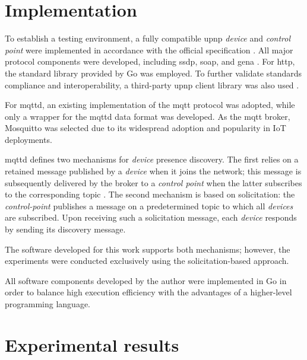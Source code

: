 \documentclass[lettersize,journal]{IEEEtran}
\begin{document}
\section{Implementation}

To establish a testing environment, a fully compatible \gls{upnp} \textit{device} and \textit{control point} were implemented in accordance with the official specification \cite{ocf_upnp_architecture_2020}. All major protocol components were developed, including \gls{ssdp}, \gls{soap}, and \gls{gena} \cite{DaniDF_MQTT-Discovery_vs_UPnP}. For \gls{http}, the standard library provided by Go was employed. To further validate standards compliance and interoperability, a third-party \gls{upnp} client library was also used \cite{goupnp}.

For \gls{mqttd}, an existing implementation of the \gls{mqtt} protocol was adopted, while only a wrapper for the \gls{mqttd} data format was developed. As the \gls{mqtt} broker, Mosquitto was selected due to its widespread adoption and popularity in IoT deployments.

\gls{mqttd} defines two mechanisms for \textit{device} presence discovery. The first relies on a retained message published by a \textit{device} when it joins the network; this message is subsequently delivered by the broker to a \textit{control point} when the latter subscribes to the corresponding topic \cite{mqttd}. The second mechanism is based on solicitation: the \textit{control-point} publishes a message on a predetermined topic to which all \textit{devices} are subscribed. Upon receiving such a solicitation message, each \textit{device} responds by sending its discovery message\cite{mqttd}.

The software developed for this work \cite{DaniDF_MQTT-Discovery_vs_UPnP} supports both mechanisms; however, the experiments were conducted exclusively using the solicitation-based approach.

All software components developed by the author \cite{DaniDF_MQTT-Discovery_vs_UPnP} were implemented in Go in order to balance high execution efficiency with the advantages of a higher-level programming language.

\section{Experimental results}
\end{document}
